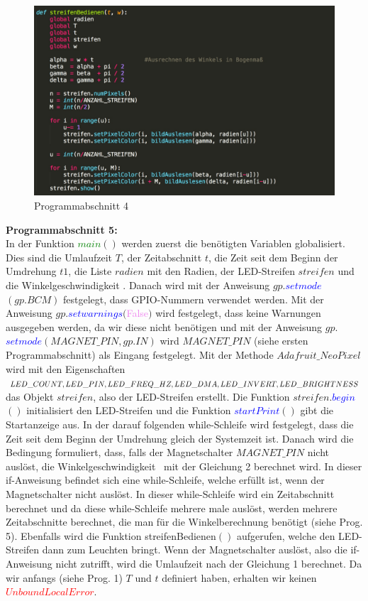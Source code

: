 \documentclass [a4paper, 11pt] {article}
\begin{document}
\begin{figure}[H]
	\centering
	\includegraphics[width=16cm]{P5.png}
	\caption{Programmabschnitt 4}
\end{figure} 
\textbf{\large Programmabschnitt 5:}\\
In der Funktion \textcolor{green}{$main$}{$()$} werden zuerst die benötigten Variablen globalisiert. Dies sind die Umlaufzeit {$T$}, der Zeitabschnitt {$t$}, die Zeit seit dem Beginn der Umdrehung {$t1$}, die Liste {$radien$} mit den Radien, der LED-Streifen {$streifen$} und die Winkelgeschwindigkeit \textomega. Danach wird mit der Anweisung {$gp.$}\textcolor{blue}{$setmode$}{$(gp.BCM)$} festgelegt, dass GPIO-Nummern verwendet werden. Mit der Anweisung {$gp.$}\textcolor{blue}{$setwarnings$}{$($}\textcolor{violet}{False}{$)$} wird festgelegt, dass keine Warnungen ausgegeben werden, da wir diese nicht benötigen und mit der Anweisung {$gp.$}\textcolor{blue}{$setmode$}{$(MAGNET\_PIN, gp.IN)$} wird {$MAGNET\_PIN$} (siehe ersten Programmabschnitt) als Eingang festgelegt. Mit der Methode {$Adafruit\_NeoPixel$} wird mit den Eigenschaften {$LED\_COUNT, LED\_PIN, LED\_FREQ\\ \_HZ, LED\_DMA, LED\_INVERT, LED\_BRIGHTNESS$} das Objekt {$streifen$}, also der LED-Streifen erstellt. Die Funktion {$streifen.$}\textcolor{blue}{$begin$}{$()$} initialisiert den LED-Streifen und die Funktion \textcolor{blue}{$startPrint$}{$()$} gibt die Startanzeige aus. In der darauf folgenden while-Schleife wird festgelegt, dass die Zeit seit dem Beginn der Umdrehung gleich der Systemzeit ist. Danach wird die Bedingung formuliert, dass, falls der Magnetschalter {$MAGNET\_PIN$} nicht auslöst, die Winkelgeschwindigkeit \textomega\ mit der Gleichung 2 berechnet wird. In dieser if-Anweisung befindet sich eine while-Schleife, welche erfüllt ist, wenn der Magnetschalter nicht auslöst. In dieser while-Schleife wird ein Zeitabschnitt berechnet und da diese while-Schleife mehrere male auslöst, werden mehrere Zeitabschnitte berechnet, die man für die Winkelberechnung benötigt (siehe Prog. 5). Ebenfalls wird die Funktion streifenBedienen{$()$} aufgerufen, welche den LED-Streifen dann zum Leuchten bringt. Wenn der Magnetschalter auslöst, also die if-Anweisung nicht zutrifft, wird die Umlaufzeit nach der Gleichung 1 berechnet. Da wir anfangs (siehe Prog. 1) {$T$} und {$t$} definiert haben, erhalten wir keinen \textcolor{red}{$UnboundLocalError$}.
\end{document}
